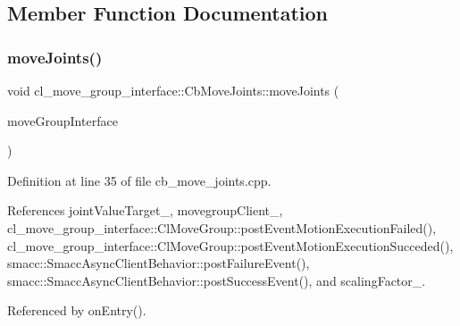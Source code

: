 \subsection{Member Function Documentation}
\mbox{\label{classcl__move__group__interface_1_1CbMoveJoints_ad91d243eb8a818e240d85e5a7fdea68d}} 
\subsubsection{\texorpdfstring{move\+Joints()}{moveJoints()}}
{\footnotesize\ttfamily void cl\+\_\+move\+\_\+group\+\_\+interface\+::\+Cb\+Move\+Joints\+::move\+Joints (\begin{DoxyParamCaption}\item[{moveit\+::planning\+\_\+interface\+::\+Move\+Group\+Interface \&}]{move\+Group\+Interface }\end{DoxyParamCaption})\hspace{0.3cm}{\ttfamily [protected]}}



Definition at line 35 of file cb\+\_\+move\+\_\+joints.\+cpp.



References joint\+Value\+Target\+\_\+, movegroup\+Client\+\_\+, cl\+\_\+move\+\_\+group\+\_\+interface\+::\+Cl\+Move\+Group\+::post\+Event\+Motion\+Execution\+Failed(), cl\+\_\+move\+\_\+group\+\_\+interface\+::\+Cl\+Move\+Group\+::post\+Event\+Motion\+Execution\+Succeded(), smacc\+::\+Smacc\+Async\+Client\+Behavior\+::post\+Failure\+Event(), smacc\+::\+Smacc\+Async\+Client\+Behavior\+::post\+Success\+Event(), and scaling\+Factor\+\_\+.



Referenced by on\+Entry().


